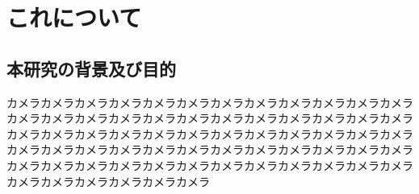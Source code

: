 \documentclass[11pt, a4paper]{jsarticle}
\numberwithin{equation}{section}
\newcommand{\newsection}[1]{\clearpage \vspace*{20zw} \section{#1} \clearpage}
\begin{document}
\layout

{}
\tableofcontents
\clearpage
{}

\newsection{これについて}

\subsection{本研究の背景及び目的}
カメラカメラカメラカメラカメラカメラカメラカメラカメラカメラカメラカメラカメラカメラカメラカメラカメラカメラカメラカメラカメラカメラカメラカメラカメラカメラカメラカメラカメラカメラカメラカメラカメラカメラカメラカメラカメラカメラカメラカメラカメラカメラカメラカメラカメラカメラカメラカメラカメラカメラカメラカメラカメラカメラカメラカメラカメラカメラカメラカメラカメラカメラカメラカメラカメラカメラ
\end{document}
